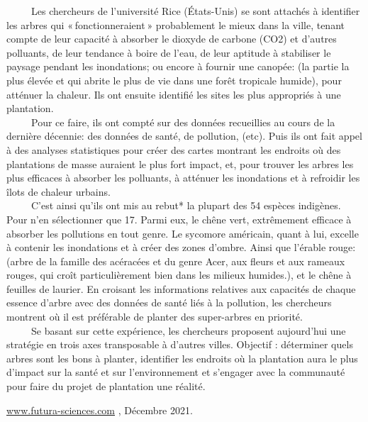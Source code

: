 \documentclass[a3paper,landscape,10pt]{article}
\begin{document}
{\begin{multicols}{2}
\begin{flushleft}
\begin{center}
\begin{flushleft}
\begin{flushleft}
~ ~ ~  Les  chercheurs de l’université Rice (États-Unis) se sont attachés à identifier les arbres qui  « fonctionneraient » probablement le mieux dans la ville, tenant compte de leur capacité à absorber le dioxyde de carbone (CO2) et d'autres polluants, de leur tendance à boire de l'eau, de leur aptitude à stabiliser le paysage pendant les inondations; ou encore à fournir une canopée: (la partie la plus élevée et qui abrite le plus de vie dans une forêt tropicale humide), pour atténuer la chaleur. Ils ont ensuite identifié les sites les plus appropriés à une plantation.  \\

~ ~ ~  Pour ce faire, ils ont compté sur des données recueillies au cours de la dernière décennie: des données de santé, de pollution, (etc). Puis ils ont fait appel à des analyses statistiques pour créer des cartes montrant les endroits où des plantations de masse auraient le plus fort impact,  et,  pour trouver les arbres les plus efficaces à absorber les polluants, à atténuer les inondations et à refroidir les îlots de chaleur urbains.
\\
~ ~ ~  C'est ainsi qu'ils ont mis au rebut* la plupart des 54 espèces indigènes. Pour n'en sélectionner que 17. Parmi eux, le chêne vert, extrêmement efficace à absorber les pollutions en tout genre. Le sycomore américain, quant à lui, excelle à contenir les inondations et à créer des zones d'ombre.  Ainsi que l'érable rouge: (arbre de la famille des acéracées et du genre Acer, aux fleurs et aux rameaux rouges, qui croît particulièrement bien dans les milieux humides.), et le chêne à feuilles de laurier. En croisant les informations relatives aux capacités de chaque essence d’arbre avec des données de santé liés à la pollution, les chercheurs montrent où il est préférable de planter des super-arbres en priorité.
\\
~ ~ ~  Se basant sur cette expérience, les chercheurs proposent aujourd'hui une stratégie en trois axes transposable à d'autres villes. Objectif : déterminer quels arbres sont les bons à planter, identifier les endroits où la plantation aura le plus d'impact sur la santé et sur l'environnement et s'engager avec la communauté pour faire du projet de plantation une réalité.
\\

\end{flushleft}


\begin{flushright}
      \underline{www.futura-sciences.com} , Décembre 2021. \end{flushright}


\end{flushleft}
\end{center}
\end{flushleft}
\end{multicols}}
\end{document}
